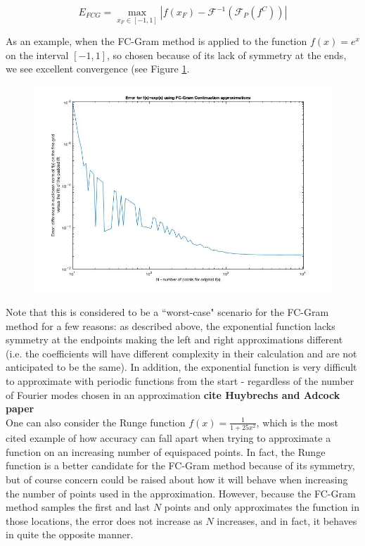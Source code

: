 \documentclass[11pt]{amsart}
\begin{document}
\begin{equation}
E_{FCG}=\max_{x_F \in [-1,1]} |f(x_F)-\mathscr{F}^{-1}(\mathscr{F}_P(f^C))|
\end{equation}



As an example, when the FC-Gram method is applied to the function $f(x)=e^x$ on the interval $[-1,1]$, so chosen because of its lack of symmetry at the ends, we see excellent convergence (see Figure \ref{figure:FCExp}. 
\begin{figure}[h]
\begin{center}
\includegraphics[scale=0.5]{ErrorFCGramonExp.jpg}
\label{figure:FCExp}
\end{center}
\end{figure}
Note that this is considered to be a ``worst-case" scenario for the FC-Gram method for a few reasons: as described above, the exponential function lacks symmetry at the endpoints making the left and right approximations different (i.e. the coefficients will have different complexity in their calculation and are not anticipated to be the same). In addition, the exponential function is very difficult to approximate with periodic functions from the start - regardless of the number of Fourier modes chosen in an approximation \textbf{cite Huybrechs and Adcock paper} \\ 

One can also consider the Runge function $f(x)=\frac{1}{1+25x^2}$, which is the most cited example of how accuracy can fall apart when trying to approximate a function on an increasing number of equispaced points.  In fact, the Runge function is a better candidate for the FC-Gram method because of its symmetry, but of course concern could be raised about how it will behave when increasing the number of points used in the approximation. However, because the FC-Gram method samples the first and last $N$ points and only approximates the function in those locations, the error does not increase as $N$ increases, and in fact, it behaves in quite the opposite manner. 
\end{document}
